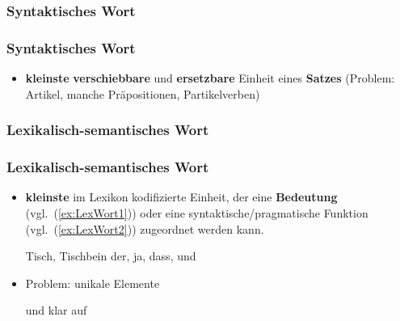 \subsubsection{Syntaktisches Wort}


\begin{frame}
\frametitle{Syntaktisches Wort}

\begin{itemize}
	\item \textbf{kleinste} \textbf{verschiebbare} und \textbf{ersetzbare} Einheit eines \textbf{Satzes}
	(Problem: Artikel, manche Präpositionen, Partikelverben)
	
	\ea
		\z 
	\ex 
		\z 
	\z
	
%	

\end{itemize}

\end{frame}


\subsubsection{Lexikalisch-semantisches Wort}


\begin{frame}
\frametitle{Lexikalisch-semantisches Wort}

\begin{itemize}
	\item \textbf{kleinste} im Lexikon kodifizierte Einheit, der eine \textbf{Bedeutung} (vgl.\ (\ref{ex:LexWort1})) oder eine syntaktische/pragmatische Funktion (vgl.\ (\ref{ex:LexWort2})) zugeordnet werden kann.
	
	\ea 
		\ea\label{ex:LexWort1} Tisch, Tischbein
		\ex\label{ex:LexWort2} der, ja, dass, und 
		\z 
	\z 

	\item Problem: unikale Elemente
	
	\ea 
		\ea {} und klar
		\ex auf 
		\z 
	\z 
	

\end{itemize}

\end{frame}


